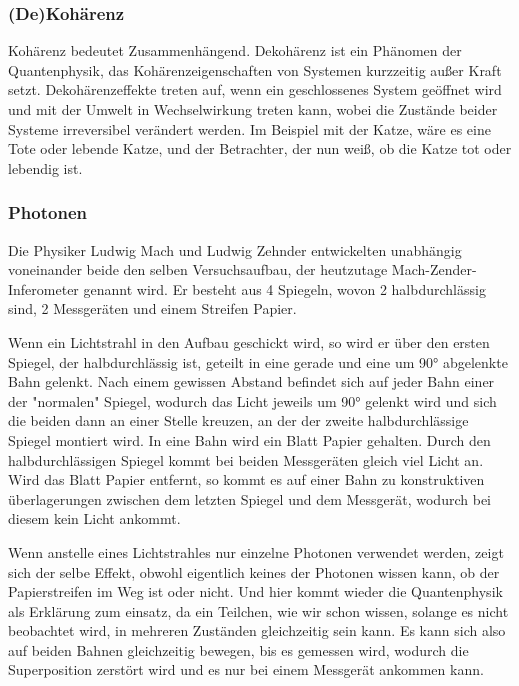 \subsubsection{(De)Kohärenz}
\label{sec:koharenz}

Kohärenz bedeutet Zusammenhängend. Dekohärenz ist ein Phänomen der Quantenphysik, das Kohärenzeigenschaften von Systemen kurzzeitig außer Kraft setzt. Dekohärenzeffekte treten auf, wenn ein geschlossenes System geöffnet wird und mit der Umwelt in Wechselwirkung treten kann, wobei die Zustände beider Systeme irreversibel verändert werden.
Im Beispiel mit der Katze, wäre es eine Tote oder lebende Katze, und der Betrachter, der nun weiß, ob die Katze tot oder lebendig ist.

\subsubsection{Photonen}
\label{sec:photonen}

Die Physiker Ludwig Mach und Ludwig Zehnder entwickelten unabhängig voneinander beide den selben Versuchsaufbau, der heutzutage Mach-Zender-Inferometer genannt wird. Er besteht aus 4 Spiegeln, wovon 2 halbdurchlässig sind, 2 Messgeräten und einem Streifen Papier.

Wenn ein Lichtstrahl in den Aufbau geschickt wird, so wird er über den ersten Spiegel, der halbdurchlässig ist, geteilt in eine gerade und eine um 90° abgelenkte Bahn gelenkt. Nach einem gewissen Abstand befindet sich auf jeder Bahn einer der "normalen" Spiegel, wodurch das Licht jeweils um 90° gelenkt wird und sich die beiden dann an einer Stelle kreuzen, an der der zweite halbdurchlässige Spiegel montiert wird. In eine Bahn wird ein Blatt Papier gehalten. Durch den halbdurchlässigen Spiegel kommt bei beiden Messgeräten gleich viel Licht an. Wird das Blatt Papier entfernt, so kommt es auf einer Bahn zu konstruktiven überlagerungen zwischen dem letzten Spiegel und dem Messgerät, wodurch bei diesem kein Licht ankommt.

Wenn anstelle eines Lichtstrahles nur einzelne Photonen verwendet werden, zeigt sich der selbe Effekt, obwohl eigentlich keines der Photonen wissen kann, ob der Papierstreifen im Weg ist oder nicht. Und hier kommt wieder die Quantenphysik als Erklärung zum einsatz, da ein Teilchen, wie wir schon wissen, solange es nicht beobachtet wird, in mehreren Zuständen gleichzeitig sein kann. Es kann sich also auf beiden Bahnen gleichzeitig bewegen, bis es gemessen wird, wodurch die Superposition zerstört wird und es nur bei einem Messgerät ankommen kann.


